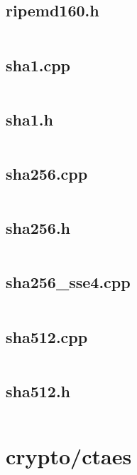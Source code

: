 \documentclass{article}
\begin{document}
\subsection{ripemd160.h}
\inputminted{cpp}{/home/dufferzafar/dev/@clones/bitcoin/src/crypto/ripemd160.h}
\newpage

\subsection{sha1.cpp}
\inputminted{cpp}{/home/dufferzafar/dev/@clones/bitcoin/src/crypto/sha1.cpp}
\newpage

\subsection{sha1.h}
\inputminted{cpp}{/home/dufferzafar/dev/@clones/bitcoin/src/crypto/sha1.h}
\newpage

\subsection{sha256.cpp}
\inputminted{cpp}{/home/dufferzafar/dev/@clones/bitcoin/src/crypto/sha256.cpp}
\newpage

\subsection{sha256.h}
\inputminted{cpp}{/home/dufferzafar/dev/@clones/bitcoin/src/crypto/sha256.h}
\newpage

\subsection{sha256\_sse4.cpp}
\inputminted{cpp}{/home/dufferzafar/dev/@clones/bitcoin/src/crypto/sha256_sse4.cpp}
\newpage

\subsection{sha512.cpp}
\inputminted{cpp}{/home/dufferzafar/dev/@clones/bitcoin/src/crypto/sha512.cpp}
\newpage

\subsection{sha512.h}
\inputminted{cpp}{/home/dufferzafar/dev/@clones/bitcoin/src/crypto/sha512.h}
\newpage

\section{crypto/ctaes}
\end{document}
